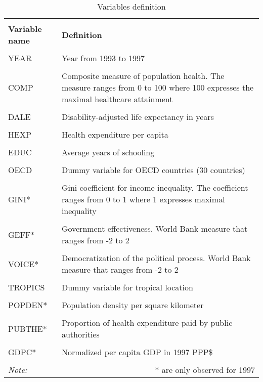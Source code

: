 \documentclass[12pt,a4paper]{article}\usepackage[]{graphicx}\usepackage[]{color}
\begin{document}
\begin{table}[htbp] \centering 
  \caption{Variables definition} 
  \label{Variables definition} 
  \footnotesize
\begin{tabular}{p{3cm} p{9cm}} 
\\[-1.8ex]\hline 
\hline \\[-1.8ex] 
\textbf{Variable name} & \textbf{Definition} \\ 
\hline \\[-1.8ex] 
YEAR & Year from 1993 to 1997 \\
\hline \\[-1.8ex] 
COMP & Composite measure of population health. The measure ranges from 0 to 100 where 100 expresses the maximal healthcare attainment \\
\hline \\[-1.8ex] 
DALE & Disability-adjusted life expectancy in years \\
\hline \\[-1.8ex] 
HEXP & Health expenditure per capita \\
\hline \\[-1.8ex] 
EDUC & Average years of schooling \\
\hline \\[-1.8ex] 
OECD & Dummy variable for OECD countries (30 countries) \\
\hline \\[-1.8ex] 
GINI* & Gini coefficient for income inequality. The coefficient ranges from 0 to 1 where 1 expresses maximal inequality \\
\hline \\[-1.8ex] 
GEFF* & Government effectiveness. World Bank measure that ranges from -2 to 2 \\
\hline \\[-1.8ex] 
VOICE* & Democratization of the political process. World Bank measure that ranges from -2 to 2 \\
\hline \\[-1.8ex] 
TROPICS & Dummy variable for tropical location \\
\hline \\[-1.8ex] 
POPDEN* & Population density per square kilometer \\
\hline \\[-1.8ex] 
PUBTHE* & Proportion of health expenditure paid by public authorities \\
\hline \\[-1.8ex] 
GDPC* & Normalized per capita GDP in 1997 PPP\$ \\
\hline
\hline \\[-1.8ex] 
\textit{Note:} & \multicolumn{1}{r}{* are only observed for 1997} \\ 
\end{tabular} 
\end{table} 
\normalsize
\end{document}
